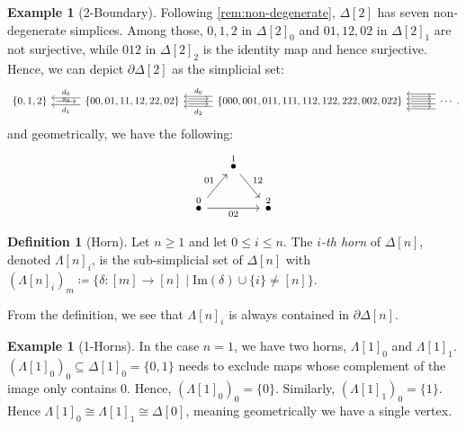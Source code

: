 \documentclass[11pt, a4paper]{amsart}
\theoremstyle{definition}
\newtheorem{definition}[equation]{Definition}
\newtheorem{example}[equation]{Example}
\theoremstyle{remark}
\numberwithin{equation}{section}
\begin{document}
\begin{example}[2-Boundary]
  Following \cref{rem:non-degenerate}, $\Delta[2]$ has seven non-degenerate simplices. Among those, $0,1,2$ in $\Delta[2]_0$ and $01,12,02$ in $\Delta[2]_1$ are not surjective, while $012$ in $\Delta[2]_2$ is the identity map and hence surjective. Hence, we can depict $\partial \Delta[2]$ as the simplicial set: 
  {\small
  \[
  \begin{tikzcd}[column sep=1cm]
   \{0,1,2\} \arrow[r, shorten >=1ex,shorten <=1ex, "s_0"'  yshift= .2cm]
   & \{00,01,11,12,22,02\} 
   \arrow[l, shift left=1.4, "d_1"] \arrow[l, shift right=1.4, "d_0"'] 
   \arrow[r, shift right, shorten >=1ex,shorten <=1ex ] \arrow[r, shift left, shorten >=1ex,shorten <=1ex] 
   & \{000,001,011,111,112,122,222,002,022\} 
   \arrow[l] \arrow[l, shift left=2, "d_2"] \arrow[l, shift right=2, "d_0"'] 
   \arrow[r, shorten >=1ex,shorten <=1ex] \arrow[r, shift left=2, shorten >=1ex,shorten <=1ex] 
   \arrow[r, shift right=2, shorten >=1ex,shorten <=1ex]
   & \cdots 
   \arrow[l, shift right=1] \arrow[l, shift left=1] \arrow[l, shift right=3] \arrow[l, shift left=3] 
 \end{tikzcd}.
  \]
  }
  and geometrically, we have the following:
  \[ 
  \begin{tikzcd}[row sep=0.5cm, column sep=0.5cm]
    & \overset{1}{\bullet} \arrow[dr, "12"] & \\
    \overset{0}{\bullet} \arrow[ur, "01"] \arrow[rr, "02"'] &   & \overset{2}{\bullet}
  \end{tikzcd}
  \]
\end{example}

\begin{definition}[Horn]
  Let $n \geq 1$ and let $0 \leq i \leq n$. The \emph{$i$-th horn} of $\Delta[n]$, denoted $\Lambda[n]_i$, is the sub-simplicial set of $\Delta[n]$ with $(\Lambda[n]_i)_m \coloneq \{ \delta\colon [m] \to [n] \mid \mathrm{Im}(\delta) \cup \{i\} \neq [n] \}$. 
\end{definition}

From the definition, we see that $\Lambda[n]_i$ is always contained in $\partial \Delta[n]$. 

\begin{example}[1-Horns] \label{ex:lambda one horns}
 In the case $n = 1$, we have two horns, $\Lambda[1]_0$ and $\Lambda[1]_1$. $(\Lambda[1]_0)_0 \subseteq \Delta[1]_0 = \{0,1\}$ needs to exclude maps whose complement of the image only contains $0$. Hence, $(\Lambda[1]_0)_0 = \{0\}$. Similarly, $(\Lambda[1]_1)_0 = \{1\}$. Hence $\Lambda[1]_0 \cong \Lambda[1]_1 \cong \Delta[0]$, meaning geometrically we have a single vertex.
\end{example}
\end{document}
